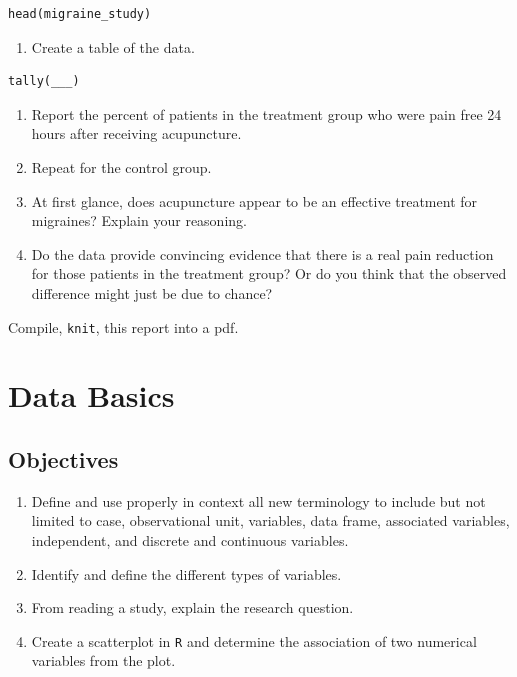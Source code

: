 \documentclass[
]{book}
\providecommand{\tightlist}{%
  \setlength{\itemsep}{0pt}\setlength{\parskip}{0pt}}
\begin{document}
\begin{verbatim}
head(migraine_study)
\end{verbatim}

\begin{enumerate}
\def\labelenumi{\alph{enumi}.}
\setcounter{enumi}{1}
\tightlist
\item
  Create a table of the data.
\end{enumerate}

\begin{verbatim}
tally(___)
\end{verbatim}

\begin{enumerate}
\def\labelenumi{\alph{enumi}.}
\setcounter{enumi}{2}
\tightlist
\item
  Report the percent of patients in the treatment group who were pain free 24 hours after receiving acupuncture.\\
\item
  Repeat for the control group.\\
\item
  At first glance, does acupuncture appear to be an effective treatment for migraines? Explain your reasoning.\\
\item
  Do the data provide convincing evidence that there is a real pain reduction for those patients in the treatment group? Or do you think that the observed difference might just be due to chance?
\end{enumerate}

Compile, \texttt{knit}, this report into a pdf.

\hypertarget{DB}{%
\chapter{Data Basics}\label{DB}}

\hypertarget{objectives-1}{%
\section{Objectives}\label{objectives-1}}

\begin{enumerate}
\def\labelenumi{\arabic{enumi})}
\tightlist
\item
  Define and use properly in context all new terminology to include but not limited to case, observational unit, variables, data frame, associated variables, independent, and discrete and continuous variables.\\
\item
  Identify and define the different types of variables.\\
\item
  From reading a study, explain the research question.\\
\item
  Create a scatterplot in \texttt{R} and determine the association of two numerical variables from the plot.
\end{enumerate}
\end{document}

